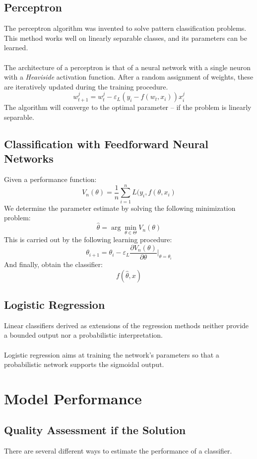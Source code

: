 \documentclass{article}
\begin{document}
\subsection{Perceptron}
The perceptron algorithm was invented to solve pattern classification problems. This method works well on linearly separable classes, and its parameters can be learned. \\ \\
The architecture of a perceptron is that of a neural network with a single neuron with a \textit{Heaviside} activation function. After a random assignment of weights, these are iteratively updated during the training procedure.
\[ w^j_{t+1} = w^j_t - \varepsilon_L(y_i - f(w_t, x_i))x^j_i \]
The algorithm will converge to the optimal parameter -- if the problem is linearly separable.

\subsection{Classification with Feedforward Neural Networks}
Given a performance function:
\[ V_n(\theta) = \frac{1}{n} \sum^n_{i = 1} L(y_i, f(\theta, x_i) \]
We determine the parameter estimate by solving the following minimization problem:
\[ \hat\theta = \arg\min_{\theta \in \Theta} V_n(\theta) \]
This is carried out by the following learning procedure:
\[ \theta_{i+1} = \theta_i - \varepsilon_L \frac{\partial V_n(\theta)}{\partial\theta} \Big|_{\theta = \theta_i} \]
And finally, obtain the classifier:
\[ f(\hat\theta, x) \]

\subsection{Logistic Regression}
Linear classifiers derived as extensions of the regression methods neither provide a bounded output nor a probabilistic interpretation. \\ \\
Logistic regression aims at training the network's parameters so that a probabilistic network supports the sigmoidal output.

\section{Model Performance}
\subsection{Quality Assessment if the Solution}
There are several different ways to estimate the performance of a classifier.
\end{document}
